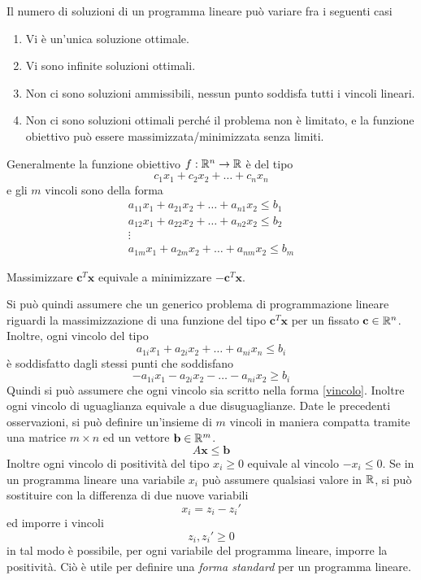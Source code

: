 \documentclass[10pt, letterpaper]{report}
\begin{document}
Il numero di soluzioni di un programma lineare può variare fra i seguenti casi\begin{enumerate}
    \item Vi è un'unica soluzione ottimale.
    \item Vi sono infinite soluzioni ottimali.
    \item Non ci sono soluzioni ammissibili, nessun punto soddisfa tutti i vincoli lineari.
    \item Non ci sono soluzioni ottimali perché il problema non è limitato, e la funzione obiettivo può essere massimizzata/minimizzata senza limiti.
\end{enumerate}
Generalmente la funzione obiettivo  $f:{\mathbb R}^n\rightarrow {\mathbb R}$ è del tipo 
$$c_1x_1+c_2x_2+\dots+c_nx_n $$
e gli $m$ vincoli sono della forma $$\begin{matrix}
    a_{11}x_1+a_{21}x_2+\dots + a_{n1}x_2\le b_1\\ 
    a_{12}x_1+a_{22}x_2+\dots + a_{n2}x_2\le b_2\\ \vdots \\ 
    a_{1m}x_1+a_{2m}x_2+\dots + a_{nm}x_2\le b_m
\end{matrix}$$
\begin{osservazione}
    Massimizzare  $\mathbf c^T \mathbf x$ equivale a minimizzare $\mathbf -\mathbf c^T\mathbf x $.
\end{osservazione}
Si può quindi assumere che un generico problema di programmazione lineare riguardi la massimizzazione di una funzione del tipo $\mathbf c^T \mathbf x$ per un fissato $\mathbf c \in {\mathbb R}^n$. Inoltre, ogni vincolo del tipo 
\begin{equation}\label{vincolo} a_{1i}x_1+a_{2i}x_2+\dots + a_{ni}x_n\le b_i\end{equation}
è soddisfatto dagli stessi punti che soddisfano 
$$ -a_{1i}x_1-a_{2i}x_2-\dots - a_{ni}x_2\ge b_i $$
Quindi si può assumere che ogni vincolo sia scritto nella forma \ref{vincolo}. Inoltre ogni vincolo di uguaglianza equivale a due disuguaglianze. Date le precedenti osservazioni, si può definire un'insieme di $m$ vincoli in maniera compatta tramite una matrice $m\times n $ ed un vettore $\mathbf b\in {\mathbb R}^m$. 
$$ A\mathbf x \le \mathbf b$$ 
Inoltre ogni vincolo di positività del tipo $x_i\ge 0$ equivale al vincolo $-x_i\le 0$. Se in un programma lineare una variabile $x_i$ può assumere qualsiasi valore in ${\mathbb R}$, si può sostituire con la differenza di due nuove variabili 
$$x_i=z_i-z_i' $$
ed imporre i vincoli $$ z_i,z_i'\ge 0$$ 
in tal modo è possibile, per ogni variabile del programma lineare, imporre la positività. Ciò è utile per definire una \textit{forma standard} per un programma lineare. 
\end{document}
